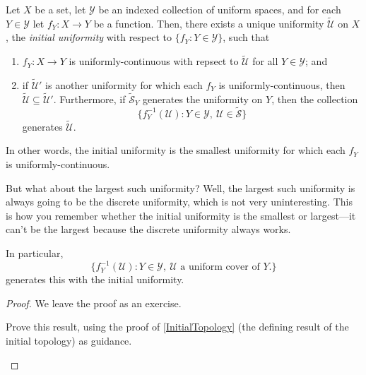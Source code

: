 \begin{prp}\label{InitialUniformity}
Let $X$ be a set, let $\mathcal{Y}$ be an indexed collection of uniform spaces, and for each $Y\in \mathcal{Y}$ let $f_Y:X\rightarrow Y$ be a function.  Then, there exists a unique uniformity $\widetilde{\mathcal{U}}$ on $X$, the \emph{initial uniformity} with respect to $\{ f_Y:Y\in \mathcal{Y}\}$, such that
\begin{enumerate}
\item $f_Y:X\rightarrow Y$ is uniformly-continuous with repsect to $\widetilde{\mathcal{U}}$ for all $Y\in \mathcal{Y}$; and
\item if $\widetilde{\mathcal{U}}'$ is another uniformity for which each $f_Y$ is uniformly-continuous, then $\widetilde{\mathcal{U}}\subseteq \widetilde{\mathcal{U}}'$.  Furthermore, if $\widetilde{\mathcal{S}}_Y$ generates the uniformity on $Y$, then the collection
\begin{equation}
\{ f_Y^{-1}(\mathcal{U}):Y\in \mathcal{Y},\ \mathcal{U}\in \widetilde{\mathcal{S}}\}
\end{equation}
generates $\widetilde{\mathcal{U}}$.
\end{enumerate}
\begin{rmk}
In other words, the initial uniformity is the smallest uniformity for which each $f_Y$ is uniformly-continuous.
\end{rmk}
\begin{rmk}
But what about the largest such uniformity?  Well, the largest such uniformity is always going to be the discrete uniformity, which is not very uninteresting.  This is how you remember whether the initial uniformity is the smallest or largest---it can't be the largest because the discrete uniformity always works.
\end{rmk}
\begin{rmk}
In particular,
\begin{equation}
\{ f_Y^{-1}(\mathcal{U}):Y\in \mathcal{Y},\ \mathcal{U}\text{ a uniform cover of }Y\text{.}\}
\end{equation}
generates this with the initial uniformity.
\end{rmk}
\begin{proof}
We leave the proof as an exercise.
\begin{exr}
Prove this result, using the proof of \cref{InitialTopology} (the defining result of the initial topology) as guidance.
\end{exr}
\end{proof}
\end{prp}
